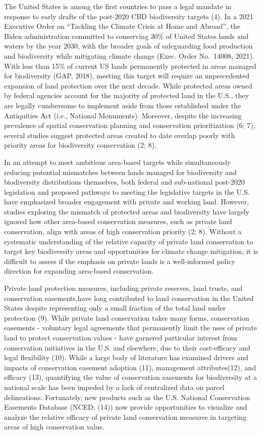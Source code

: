 \documentclass[3p]{elsarticle} %
\begin{document}
The United States is among the first countries to pass a legal mandate
in response to early drafts of the post-2020 CBD biodiversity targets
(4). In a 2021 Executive Order on ``Tackling the Climate Crisis at Home
and Abroad'', the Biden administration committed to conserving 30\% of
United States lands and waters by the year 2030, with the broader goals
of safeguarding food production and biodiversity while mitigating
climate change (Exec. Order No.~14008, 2021). With less than 15\% of
current US lands permanently protected in areas managed for biodiversity
(GAP, 2018), meeting this target will require an unprecedented expansion
of land protection over the next decade. While protected areas owned by
federal agencies account for the majority of protected land in the U.S.,
they are legally cumbersome to implement aside from those established
under the Antiquities Act (i.e., National Monuments). Moreover, despite
the increasing prevalence of spatial conservation planning and
conservation prioritization (6; 7), several studies suggest protected
areas created to date overlap poorly with priority areas for
biodiversity conservation (2; 8).

In an attempt to meet ambitious area-based targets while simultaneously
reducing potential mismatches between lands managed for biodiversity and
biodiversity distributions themselves, both federal and sub-national
post-2020 legislation and proposed pathways to meeting the legislative
targets in the U.S. have emphasized broader engagement with private and
working land. However, studies exploring the mismatch of protected areas
and biodiversity have largely ignored how other area-based conservation
measures, such as private land conservation, align with areas of high
conservation priority (2; 8). Without a systematic understanding of the
relative capacity of private land conservation to target key
biodiversity areas and opportunities for climate change mitigation, it
is difficult to assess if the emphasis on private lands is a
well-informed policy direction for expanding area-based conservation.

Private land protection measures, including private reserves, land
trusts, and conservation easements,have long contributed to land
conservation in the United States despite representing only a small
fraction of the total land under protection (9). While private land
conservation takes many forms, conservation easements - voluntary legal
agreements that permanently limit the uses of private land to protect
conservation values - have garnered particular interest from
conservation initiatives in the U.S. and elsewhere, due to their
cost-efficacy and legal flexibility (10). While a large body of
literature has examined drivers and impacts of conservation easement
adoption (11), management attributes(12), and efficacy (13), quantifying
the value of conservation easements for biodiversity at a national scale
has been impeded by a lack of centralized data on parcel delineations.
Fortunately, new products such as the U.S. National Conservation
Easements Database (NCED; (14)) now provide opportunities to visualize
and analyze the relative efficacy of private land conservation measures
in targeting areas of high conservation value.
\end{document}
